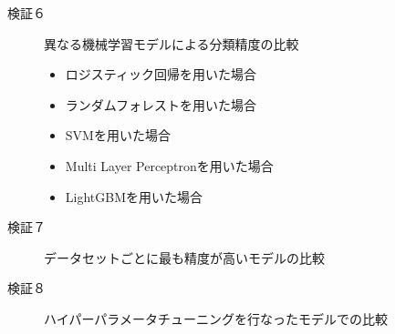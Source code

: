 \begin{description}
    \item [検証６] 異なる機械学習モデルによる分類精度の比較
    \begin{itemize}
        \item ロジスティック回帰を用いた場合
        \item ランダムフォレストを用いた場合
        \item SVMを用いた場合
        \item Multi Layer Perceptronを用いた場合
        \item LightGBMを用いた場合
    \end{itemize}

    \item [検証７] データセットごとに最も精度が高いモデルの比較

    \item [検証８] ハイパーパラメータチューニングを行なったモデルでの比較
    

\end{description}